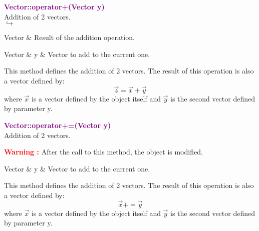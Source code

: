 \textcolor{purple}{\textbf{Vector::operator+(Vector y)}}\label{Vector::operator+(Vector y)}\\
Addition of 2 vectors.\\ \hspace*{5mm}$\hookrightarrow$
\vspace*{-2em}\begin{tcolorbox}[grow to left by=-1cm, width=\textwidth-1cm,myArgs,tabularx={l|R}]
Vector & Result of the addition operation.
\end{tcolorbox}

\begin{tcolorbox}[width=\textwidth,myArgs,tabularx={ll|R}]
Vector & y & Vector to add to the current one.
\end{tcolorbox}

This method defines the addition of 2 vectors.
The result of this operation is also a vector defined by:
\begin{equation*}
\overrightarrow{z}=\overrightarrow{x}+\overrightarrow{y}
\end{equation*}
where $\overrightarrow{x}$ is a vector defined by the object itself and $\overrightarrow{y}$ is the second vector defined by parameter y.

\textcolor{purple}{\textbf{Vector::operator+=(Vector y)}}\label{Vector::operator+=(Vector y)}\\
Addition of 2 vectors.

\hspace*{10mm}\textcolor{red}{\textbf{Warning :}} After the call to this method, the object is modified.

\begin{tcolorbox}[width=\textwidth,myArgs,tabularx={ll|R}]
Vector & y & Vector to add to the current one.
\end{tcolorbox}

This method defines the addition of 2 vectors.
The result of this operation is also a vector defined by:
\begin{equation*}
\overrightarrow{x}+=\overrightarrow{y}
\end{equation*}
where $\overrightarrow{x}$ is a vector defined by the object itself and $\overrightarrow{y}$ is the second vector defined by parameter y.

